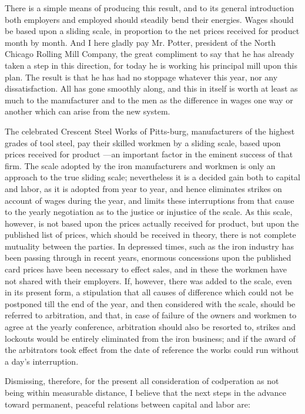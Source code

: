 \documentclass[11pt,openany]{book}
\begin{document}
There is a simple means of producing this result, and to its general introduction both employers and employed should steadily bend their energies. Wages should be based upon a sliding scale, in proportion to the net prices received for product month by month. And I here gladly pay Mr. Potter, president of the North Chicago Rolling Mill Company, the great compliment to say that he has already taken a step in this direction, for today he is working his principal mill upon this plan. The result is that he has had no stoppage whatever this year, nor any dissatisfaction. All has gone smoothly along, and this in itself is worth at least as much to the manufacturer and to the men as the difference in wages one way or another which can arise from the new system.

The celebrated Crescent Steel Works of Pitts-burg, manufacturers of the highest grades of tool steel, pay their skilled workmen by a sliding scale, based upon prices received for product ---an important factor in the eminent success of that firm. The scale adopted by the iron manufacturers and workmen is only an approach to the true sliding scale; nevertheless it is a decided gain both to capital and labor, as it is adopted from year to year, and hence eliminates strikes on account of wages during the year, and limits these interruptions from that cause to the yearly negotiation as to the justice or injustice of the scale. As this scale, however, is not based upon the prices actually received for product, but upon the published list of prices, which should be received in theory, there is not complete mutuality between the parties. In depressed times, such as the iron industry has been passing through in recent years, enormous concessions upon the published card prices have been necessary to effect sales, and in these the workmen have not shared with their employers. If, however, there was added to the scale, even in its present form, a stipulation that all causes of difference which could not be postponed till the end of the year, and then considered with the scale, should be referred to arbitration, and that, in case of failure of the owners and workmen to agree at the yearly conference, arbitration should also be resorted to, strikes and lockouts would be entirely eliminated from the iron business; and if the award of the arbitrators took effect from the date of reference the works could run without a day's interruption.

Dismissing, therefore, for the present all consideration of codperation as not being within measurable distance, I believe that the next steps in the advance toward permanent, peaceful relations between capital and labor are:
\end{document}
